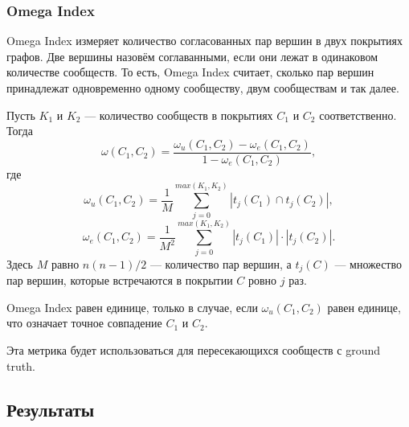 \documentclass[12pt]{article}
\begin{document}
\subsubsection*{Omega Index}

Omega Index измеряет количество согласованных пар вершин в двух покрытиях графов. Две вершины назовём соглаванными, если они лежат в одинаковом количестве сообществ. То есть, Omega Index считает, сколько пар вершин принадлежат одновременно одному сообществу, двум сообществам и так далее.

Пусть $K_1$ и $K_2$ --- количество сообществ в покрытиях $C_1$ и $C_2$ соответственно. Тогда 
\[
\omega(C_1, C_2) = \frac{\omega_u(C_1, C_2) - \omega_e(C_1, C_2)}{1 - \omega_e(C_1, C_2)},
\]
где 
\[
\omega_u(C_1, C_2) = \frac{1}{M}\sum\limits_{j=0}^{max(K_1, K_2)}|t_j(C_1)\cap t_j(C_2)|,
\]
\[
\omega_e(C_1, C_2) = \frac{1}{M^2}\sum\limits_{j=0}^{max(K_1, K_2)}|t_j(C_1)|\cdot |t_j(C_2)|.
\]
Здесь $M$ равно $n(n-1)/2$ --- количество пар вершин, а $t_j(C)$ --- множество пар вершин, которые встречаются в покрытии $C$ ровно $j$ раз.

Omega Index равен единице, только в случае, если $\omega_u(C_1, C_2)$ равен единице, что означает точное совпадение $C_1$ и $C_2$.

Эта метрика будет использоваться для пересекающихся сообществ с ground truth.

\subsection{Результаты}
\end{document}
